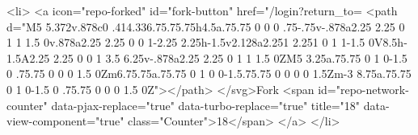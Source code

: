   <li>
          <a icon="repo-forked" id="fork-button" href="/login?return_to=%
    <path d="M5 5.372v.878c0 .414.336.75.75.75h4.5a.75.75 0 0 0 .75-.75v-.878a2.25 2.25 0 1 1 1.5 0v.878a2.25 2.25 0 0 1-2.25 2.25h-1.5v2.128a2.251 2.251 0 1 1-1.5 0V8.5h-1.5A2.25 2.25 0 0 1 3.5 6.25v-.878a2.25 2.25 0 1 1 1.5 0ZM5 3.25a.75.75 0 1 0-1.5 0 .75.75 0 0 0 1.5 0Zm6.75.75a.75.75 0 1 0 0-1.5.75.75 0 0 0 0 1.5Zm-3 8.75a.75.75 0 1 0-1.5 0 .75.75 0 0 0 1.5 0Z"></path>
</svg>Fork
    <span id="repo-network-counter" data-pjax-replace="true" data-turbo-replace="true" title="18" data-view-component="true" class="Counter">18</span>
</a>
  </li>

